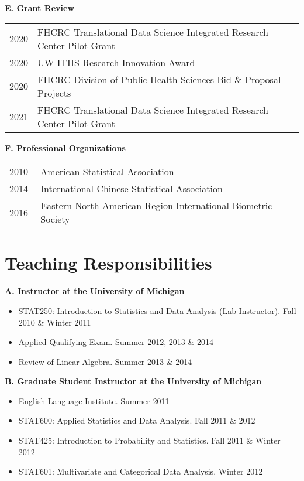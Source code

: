 \documentclass[10pt]{article}
\begin{document}
\textbf{E. Grant Review}
\begin{table}[H]
\hskip0.9cm\begin{tabular}{p{1.6cm}p{12cm}}
2020 & FHCRC Translational Data Science Integrated Research Center Pilot Grant \\
2020 & UW ITHS Research Innovation Award \\
2020 & FHCRC Division of Public Health Sciences Bid \& Proposal Projects\\
2021 & FHCRC Translational Data Science Integrated Research Center Pilot Grant
\end{tabular}
\end{table}

\textbf{F. Professional Organizations}

\begin{table}[H]
\hskip0.9cm\begin{tabular}{p{1.6cm}p{12cm}}
2010- & American Statistical Association\\
2014- & International Chinese Statistical Association\\
2016- & Eastern North American Region International Biometric Society
\end{tabular}
\end{table}


\section*{Teaching Responsibilities}

\textbf{A. Instructor at the University of Michigan}
\begin{itemize} 
\item STAT250: Introduction to Statistics and Data Analysis (Lab Instructor). Fall 2010 \& Winter 2011
\item Applied Qualifying Exam. Summer 2012, 2013 \& 2014
\item Review of Linear Algebra. Summer 2013 \& 2014
\end{itemize}

\textbf{B. Graduate Student Instructor at the University of Michigan}
\begin{itemize}  
\item English Language Institute. Summer 2011
\item STAT600: Applied Statistics and Data Analysis. Fall 2011 \& 2012
\item STAT425: Introduction to Probability and Statistics. Fall 2011 \& Winter 2012
\item STAT601: Multivariate and Categorical Data Analysis. Winter 2012
\end{itemize}
\end{document}
